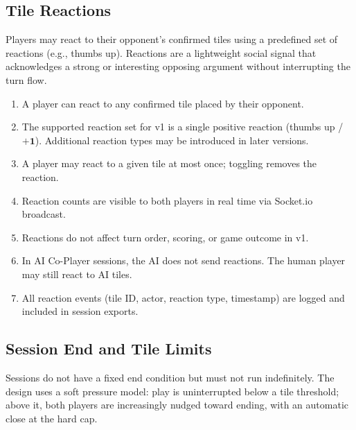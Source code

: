 \documentclass[11pt]{article}
\begin{document}
\subsection{Tile Reactions}

Players may react to their opponent's confirmed tiles using a predefined set of reactions
(e.g., thumbs up). Reactions are a lightweight social signal that acknowledges a strong or
interesting opposing argument without interrupting the turn flow.

\begin{enumerate}
  \item[\textbf{FR-12}] A player can react to any confirmed tile placed by their opponent.
  \item[\textbf{FR-13}] The supported reaction set for v1 is a single positive reaction
        (thumbs up / \(\mathbf{+1}\)). Additional reaction types may be introduced in later
        versions.
  \item[\textbf{FR-14}] A player may react to a given tile at most once; toggling removes
        the reaction.
  \item[\textbf{FR-15}] Reaction counts are visible to both players in real time via
        Socket.io broadcast.
  \item[\textbf{FR-16}] Reactions do not affect turn order, scoring, or game outcome in v1.
  \item[\textbf{FR-17}] In AI Co-Player sessions, the AI does not send reactions. The human
        player may still react to AI tiles.
  \item[\textbf{FR-18}] All reaction events (tile ID, actor, reaction type, timestamp) are
        logged and included in session exports.
\end{enumerate}

\subsection{Session End and Tile Limits}

Sessions do not have a fixed end condition but must not run indefinitely. The design uses a
soft pressure model: play is uninterrupted below a tile threshold; above it, both players are
increasingly nudged toward ending, with an automatic close at the hard cap.
\end{document}
